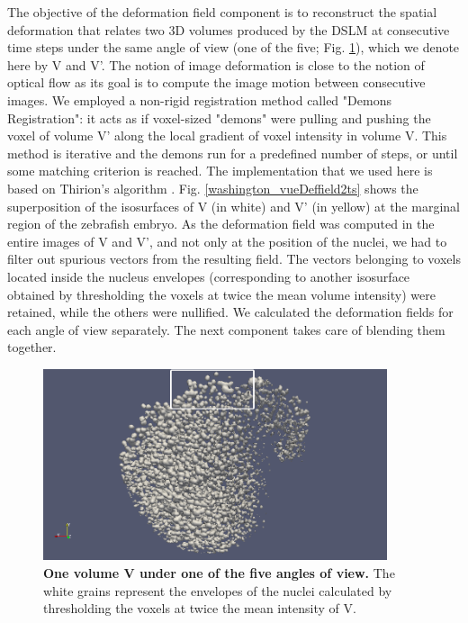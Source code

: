   The objective of the deformation field component is to reconstruct the spatial deformation that relates two 3D volumes produced by the DSLM at consecutive time steps under the same angle of view (one of the five; Fig. \ref{washington_vueGlobal_frame}), which we denote here by V and V'. The notion of image deformation is close to the notion of optical flow as its goal is to compute the image motion between consecutive images. We employed a non-rigid registration method called "Demons Registration": it acts as if voxel-sized "demons" were pulling and pushing the voxel of volume V' along the local gradient of voxel intensity in volume V. This method is iterative and the demons run for a predefined number of steps, or until some matching criterion is reached. The implementation that we used here is based on Thirion's algorithm \cite{Thirion:1998hg}. Fig. \ref{washington_vueDeffield2ts} shows the superposition of the isosurfaces of V (in white) and V' (in yellow) at the marginal region of the zebrafish embryo. As the deformation field was computed in the entire images of V and V', and not only at the position of the nuclei, we had to filter out spurious vectors from the resulting field. The vectors belonging to voxels located inside the nucleus envelopes (corresponding to another isosurface obtained by thresholding the voxels at twice the mean volume intensity) were retained, while the others were nullified. We calculated the deformation fields for each angle of view separately. The next component takes care of blending them together.  
\begin{figure}
\begin{center}
\includegraphics[width=0.9\textwidth]{../../images/Reconstruction/washington/deffield/vueGlobal_frame.png}
\end{center}
\caption{\textbf{One volume V under one of the five angles of view.} The white grains represent the envelopes of the nuclei calculated by thresholding the voxels at twice the mean intensity of V.}
\label{washington_vueGlobal_frame}
\end{figure}
